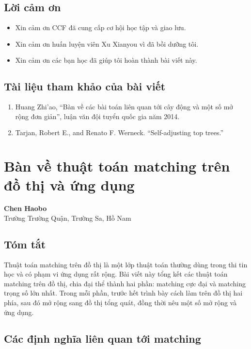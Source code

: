 \documentclass[11pt]{article}
\begin{document}
\subsection{Lời cảm ơn}

\begin{itemize}
  \item Xin cảm ơn CCF đã cung cấp cơ hội học tập và giao lưu.
  \item Xin cảm ơn huấn luyện viên Xu Xianyou vì đã bồi dưỡng tôi.
  \item Xin cảm ơn các bạn học đã giúp tôi hoàn thành bài viết này.
\end{itemize}

\subsection*{Tài liệu tham khảo của bài viết}

\begin{enumerate}
  \item Huang Zhi'ao, ``Bàn về các bài toán liên quan tới cây động và một số mở
  rộng đơn giản'', luận văn đội tuyển quốc gia năm 2014.
  \item Tarjan, Robert E., and Renato F. Werneck. ``Self-adjusting top trees.''
\end{enumerate}

\section{Bàn về thuật toán matching trên đồ thị và ứng dụng}

\begin{center}
\textbf{Chen Haobo}\\
Trường Trường Quận, Trường Sa, Hồ Nam
\end{center}

\subsection*{Tóm tắt}

Thuật toán matching trên đồ thị là một lớp thuật toán thường dùng trong thi tin
học và có phạm vi ứng dụng rất rộng. Bài viết này tổng kết các thuật toán
matching trên đồ thị, chia đại thể thành hai phần: matching cực đại và matching
trọng số lớn nhất. Trong mỗi phần, trước hết trình bày cách làm trên đồ thị hai
phía, sau đó mở rộng sang đồ thị tổng quát, đồng thời nêu một số mở rộng và ứng
dụng.

\subsection{Các định nghĩa liên quan tới matching}
\end{document}
